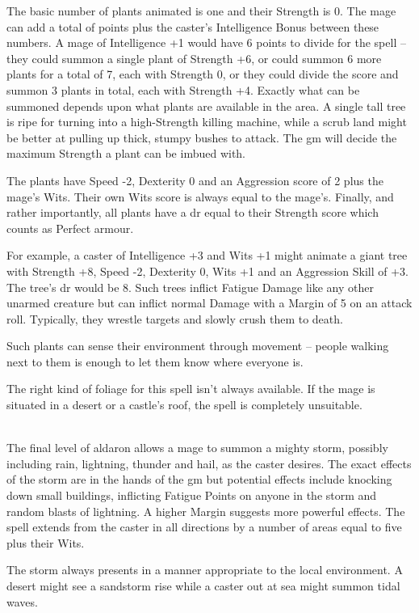 \documentclass[titlepage,a4paper,openany]{book}
\begin{document}
\begin{multicols}{2}
The basic number of plants animated is one and their Strength is 0. The mage can add a total of  points plus the caster's Intelligence Bonus between these numbers. A mage of Intelligence +1 would have 6 points to divide for the spell -- they could summon a single plant of Strength +6, or could summon 6 more plants for a total of 7, each with Strength 0, or they could divide the score and summon 3 plants in total, each with Strength +4. Exactly what can be summoned depends upon what plants are available in the area. A single tall tree is ripe for turning into a high-Strength killing machine, while a scrub land might be better at pulling up thick, stumpy bushes to attack. The \gls{gm} will decide the maximum Strength a plant can be imbued with.

The plants have Speed -2, Dexterity 0 and an Aggression score of 2 plus the mage's Wits. Their own Wits score is always equal to the mage's. Finally, and rather importantly, all plants have a \gls{dr} equal to their Strength score which counts as Perfect armour.

For example, a caster of Intelligence +3 and Wits +1 might animate a giant tree with Strength +8, Speed -2, Dexterity 0, Wits +1 and an Aggression Skill of +3. The tree's \gls{dr} would be 8. Such trees inflict Fatigue Damage like any other unarmed creature but can inflict normal Damage with a Margin of 5 on an attack roll. Typically, they wrestle targets and slowly crush them to death.

Such plants can sense their environment through movement -- people walking next to them is enough to let them know where everyone is.

The right kind of foliage for this spell isn't always available. If the mage is situated in a desert or a castle's roof, the spell is completely unsuitable.

\\
The final level of aldaron allows a mage to summon a mighty storm, possibly including rain, lightning, thunder and hail, as the caster desires. The exact effects of the storm are in the hands of the \gls{gm} but potential effects include knocking down small buildings, inflicting Fatigue Points on anyone in the storm and random blasts of lightning. A higher Margin suggests more powerful effects. The spell extends from the caster in all directions by a number of areas equal to five plus their Wits.

The storm always presents in a manner appropriate to the local environment. A desert might see a sandstorm rise while a caster out at sea might summon tidal waves.

\end{multicols}
\end{document}
